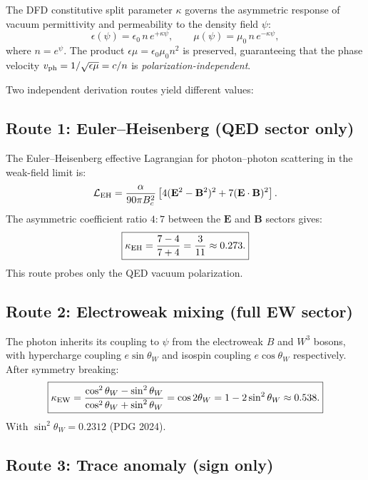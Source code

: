 \documentclass[11pt,a4paper]{article}
\theoremstyle{definition}
\begin{document}
The DFD constitutive split parameter $\kappa$ governs the
asymmetric response of vacuum permittivity and permeability to
the density field $\psi$:
\begin{equation}\label{eq:constitutive-split}
\epsilon(\psi) = \epsilon_0\, n\, e^{+\kappa\psi}, \qquad
\mu(\psi) = \mu_0\, n\, e^{-\kappa\psi},
\end{equation}
where $n = e^\psi$.  The product $\epsilon\mu = \epsilon_0\mu_0 n^2$
is preserved, guaranteeing that the phase velocity
$v_{\rm ph} = 1/\sqrt{\epsilon\mu} = c/n$ is
\emph{polarization-independent}.

Two independent derivation routes yield different values:

\subsection{Route 1: Euler--Heisenberg (QED sector only)}

The Euler--Heisenberg effective Lagrangian for photon--photon
scattering in the weak-field limit is:
\begin{equation}
\mathcal{L}_{\rm EH} = \frac{\alpha}{90\pi B_c^2}
\left[4(\mathbf{E}^2 - \mathbf{B}^2)^2
+ 7(\mathbf{E}\cdot\mathbf{B})^2\right].
\end{equation}
The asymmetric coefficient ratio $4:7$ between the $\mathbf{E}$
and $\mathbf{B}$ sectors gives:
\begin{equation}
\boxed{\kappa_{\rm EH} = \frac{7 - 4}{7 + 4} = \frac{3}{11}
\approx 0.273.}
\end{equation}
This route probes only the QED vacuum polarization.

\subsection{Route 2: Electroweak mixing (full EW sector)}

The photon inherits its coupling to $\psi$ from the electroweak
$B$ and $W^3$ bosons, with hypercharge coupling $e\sin\theta_W$
and isospin coupling $e\cos\theta_W$ respectively.  After
symmetry breaking:
\begin{equation}
\boxed{\kappa_{\rm EW} = \frac{\cos^2\theta_W - \sin^2\theta_W}
{\cos^2\theta_W + \sin^2\theta_W} = \cos 2\theta_W
= 1 - 2\sin^2\theta_W \approx 0.538.}
\end{equation}
With $\sin^2\theta_W = 0.2312$ (PDG 2024).

\subsection{Route 3: Trace anomaly (sign only)}
\end{document}
